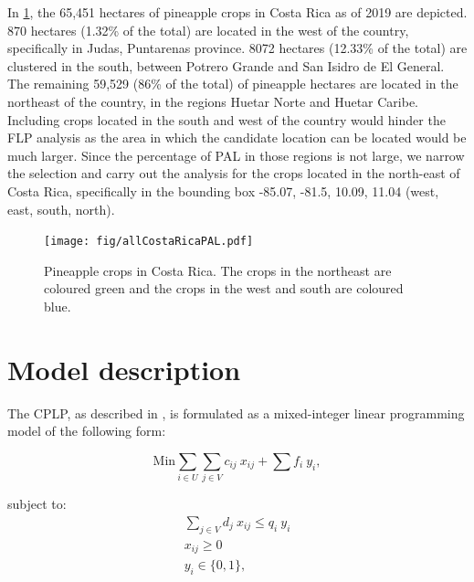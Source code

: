 In \cref{allCRPAL}, the 65,451 hectares of pineapple crops in Costa Rica as of 2019 are depicted. 870 hectares (1.32\% of the total) are located in the west of the country, specifically in Judas, Puntarenas province. 8072 hectares (12.33\% of the total) are clustered in the south, between Potrero Grande and San Isidro de El General. The remaining 59,529 (86\% of the total) of pineapple hectares are located in the northeast of the country, in the regions Huetar Norte and Huetar Caribe. Including crops located in the south and west of the country would hinder the FLP analysis as the area in which the candidate location can be located would be much larger. Since the percentage of PAL in those regions is not large, we narrow the selection and carry out the analysis for the crops located in the north-east of Costa Rica, specifically in the bounding box -85.07, -81.5, 10.09, 11.04 (west, east, south, north). 


\begin{figure}[H]
\caption[Pineapple crops in Costa Rica]{Pineapple crops in Costa Rica. The crops in the northeast are coloured green and the crops in the west and south are coloured blue.}  
\label{allCRPAL}
\centering
\texttt{[image: fig/allCostaRicaPAL.pdf]}
\end{figure}


\section{Model description}

The CPLP, as described in \cite{farahani2009facility}, is formulated as a mixed-integer linear programming model of the following form:

\begin{equation}
\label{objectivefun}
    \text{Min} \sum_{i \in U} \sum_{j \in V} c_{ij} \ x_{ij} + \sum f_i \ y_i,
\end{equation} 

subject to:
\begin{gather}
    \label{capacity}
    \sum_{j \in V} d_{j} \ x_{ij} \leq q_{i} \ y_{i} \\ 
    \label{onetone}
    x_{ij}\geq 0 \\
    y_i \in \{0,1\},
\end{gather}

